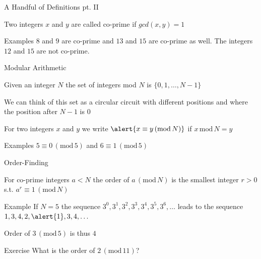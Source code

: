 \documentclass{beamer}
\begin{document}
\begin{frame}{A Handful of Definitions pt. II}

        \begin{definition}
                Two integers $x$ and $y$ are called
                \alert{co-prime} if $gcd(x,y) = 1$
        \end{definition}

        \begin{block}{Examples}
                $8$ and $9$ are co-prime and $13$ and $15$
                are co-prime as well. The integers $12$ and
                $15$ are not co-prime.
        \end{block}
\end{frame}

\begin{frame}{Modular Arithmetic}
        \begin{definition}
                Given an integer $N$ the set of \alert{integers mod $N$} is $\{
                0, 1, \dots, N - 1 \}$
        \end{definition}

        We can think of this set as a \alert{circular} circuit with different
        positions and where the position after $N-1$ is $0$

        \begin{definition}
                For two integers $x$ and $y$ we write $\alert{x \equiv y \,
                (\mathrm{mod} \, N)}$ if $x \, \mathrm{mod} \, N = y$ 
        \end{definition}

        \begin{block}{Examples}
                $5 \equiv 0 \, (\mathrm{mod} \, 5)$ and
                $6 \equiv 1 \, (\mathrm{mod} \, 5)$
        \end{block}
\end{frame}

\begin{frame}{Order-Finding}

        \begin{definition}
                For co-prime integers $a < N$ the \alert{order of $a \,
                (\mathrm{mod} \, N)$} is the smallest integer $r > 0$ s.t.
                $a^r \equiv 1 \, (\mathrm{mod} \, N)$
        \end{definition}

        \begin{block}{Example}
                If $N = 5$ the sequence $3^0, 3^1, 3^2, 3^3, 3^4, 3^5, 3^6,
                \dots$ leads to the sequence $1, 3, 4, 2, \alert{1}, 3, 4,
                \dots$ 

                Order of $3 \, (\mathrm{mod} \, 5)$ is thus $4$
        \end{block}

        \begin{block}{Exercise}
                What is the order of $2 \, (\mathrm{mod} \, 11)$?
        \end{block}
\end{frame}
\end{document}
